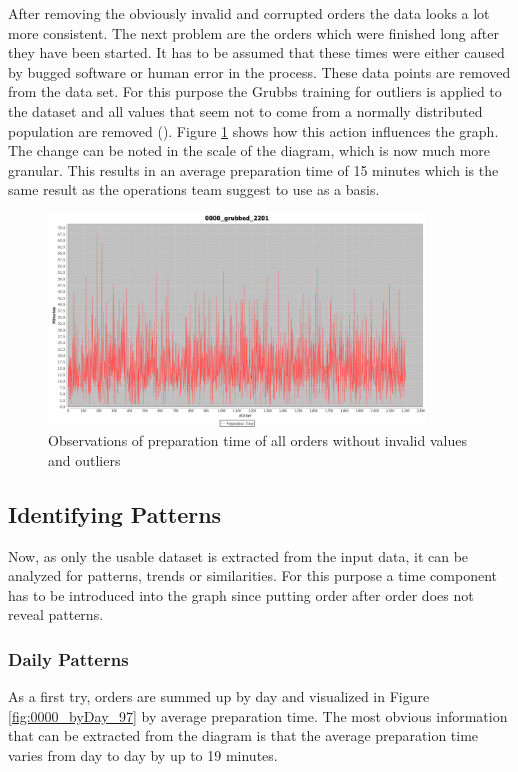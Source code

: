 After removing the obviously invalid and corrupted orders the data looks a lot more consistent. The next problem are the orders which were finished long after they have been started. It has to be assumed that these times were either caused by bugged software or human error in the process. These data points are removed from the data set. For this purpose the Grubbs training for outliers is applied to the dataset and all values that seem not to come from a normally distributed population are removed (\cite{Grubbs}). Figure \ref{fig:0000_grubbed_2201} shows how this action influences the graph. The change can be noted in the scale of the diagram, which is now much more granular. This results in an average preparation time of 15 minutes which is the same result as the operations team suggest to use as a basis.

\begin{figure}[h]
\begin{center}
\includegraphics[width=10cm]{images/0000_grubbed_2201.png}
\caption{Observations of preparation time of all orders without invalid values and outliers}
\label{fig:0000_grubbed_2201}
\end{center}
\end{figure}


\subsection{Identifying Patterns}
Now, as only the usable dataset is extracted from the input data, it can be analyzed for patterns, trends or similarities. For this purpose a time component has to be introduced into the graph since putting order after order does not reveal patterns.
\subsubsection{Daily Patterns}
As a first try, orders are summed up by day and visualized in Figure \ref{fig:0000_byDay_97}  by average preparation time. The most obvious information that can be extracted from the diagram is that the average preparation time varies from day to day by up to 19 minutes.

